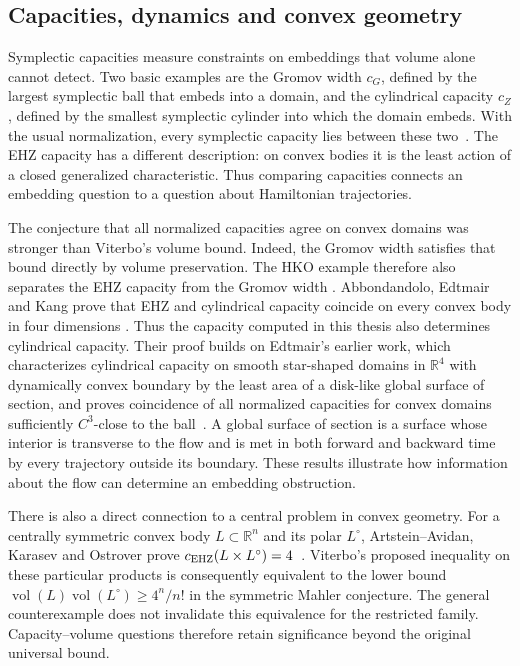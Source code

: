 \subsection{Capacities, dynamics and convex geometry}

Symplectic capacities measure constraints on embeddings that volume alone
cannot detect. Two basic examples are the Gromov width $c_G$, defined by
the largest symplectic ball that embeds into a domain, and the cylindrical
capacity $c_Z$, defined by the smallest symplectic cylinder into which the
domain embeds. With the usual normalization, every symplectic capacity lies
between these two~\cite{Edtmair2024}. The EHZ capacity has a different
description: on convex bodies it is the least action of a closed
generalized characteristic. Thus comparing capacities connects an embedding question
to a question about Hamiltonian trajectories.

The conjecture that all normalized capacities agree on convex domains was
stronger than Viterbo's volume bound. Indeed, the Gromov width satisfies
that bound directly by volume preservation. The HKO example therefore
also separates the EHZ capacity from the Gromov width
\cite{HaimKislevOstrover2024}. Abbondandolo, Edtmair and Kang prove that EHZ and cylindrical capacity
coincide on every convex body in four dimensions
\cite[Corollary~1]{AbbondandoloEdtmairKang2024}. Thus the capacity computed
in this thesis also determines cylindrical capacity. Their proof builds on
Edtmair's earlier work, which characterizes
cylindrical capacity on smooth star-shaped domains in $\mathbb R^4$ with
dynamically convex boundary by the
least area of a disk-like global surface of section, and proves coincidence
of all normalized capacities for convex domains sufficiently $C^3$-close
to the ball~\cite{Edtmair2024}. A global surface of section is a surface
whose interior is transverse to the flow and is met in both forward and
backward time by every trajectory outside its boundary. These results illustrate how information about the
flow can determine an embedding obstruction.

There is also a direct connection to a central problem in convex geometry.
For a centrally symmetric convex body $L\subset\mathbb R^n$ and its polar
$L^\circ$, Artstein--Avidan, Karasev and Ostrover prove
$c_{\rm EHZ}(L\times L^\circ)=4$~\cite{AKO2014}. Viterbo's proposed
inequality on these particular products is consequently equivalent to the
lower bound $\operatorname{vol}(L)\operatorname{vol}(L^\circ)\geq4^n/n!$
in the symmetric Mahler conjecture. The general counterexample does not
invalidate this equivalence for the restricted family. Capacity--volume
questions therefore retain significance beyond the original universal bound.

